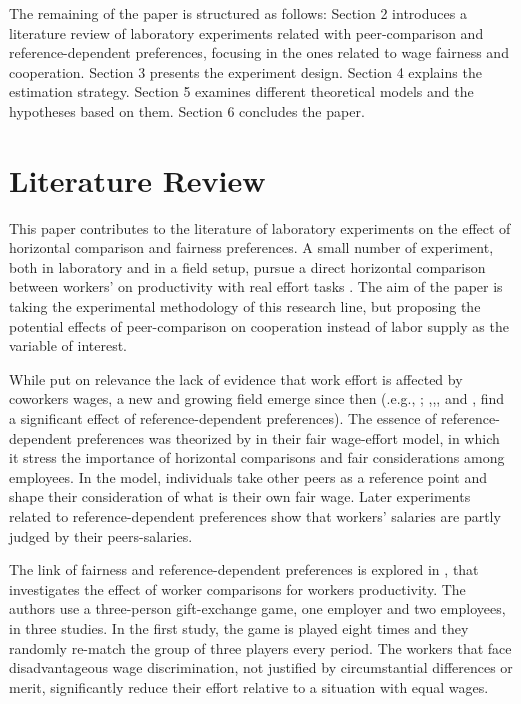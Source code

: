 \documentclass[a4paper, 12pt]{article}
\begin{document}
The remaining of the paper is structured as follows: Section 2 introduces a literature review of laboratory experiments related with peer-comparison and reference-dependent preferences, focusing in the ones related to wage fairness and cooperation. Section 3 presents the experiment design. Section 4 explains the estimation strategy. Section 5 examines different theoretical models and the hypotheses based on them. Section 6 concludes the paper. 

\section{Literature Review}

This paper contributes to the literature of laboratory experiments on the effect of horizontal comparison and fairness preferences. A small number of experiment, both in laboratory and in a field setup, pursue a direct horizontal comparison between workers’ on productivity with real effort tasks \citep{Greiner2011, Cohn2014, Azmat2015}. The aim of the paper is taking the experimental methodology of this research line, but proposing the potential effects of peer-comparison on cooperation instead of labor supply as the variable of interest. 

While \citep{Charness2007} put on relevance the lack of evidence that work effort is affected by coworkers wages, a new and growing field emerge since then (.e.g., \cite{Greiner2011}; \cite{Kube2012},\cite{Ku2013},\cite{Cohn2014}, and \cite{CohnFehr2014}, find a significant effect of reference-dependent preferences). The essence of reference-dependent preferences was theorized by \cite{Akerlof1990} in their fair wage-effort model, in which it stress the importance of horizontal comparisons and fair considerations among employees. In the model, individuals take other peers as a reference point and shape their consideration of what is their own fair wage. Later experiments related to reference-dependent preferences show that workers’ salaries are partly judged by their peers-salaries.

The link of fairness and reference-dependent preferences is explored in \cite{Gachter2012}, that investigates the effect of worker comparisons for workers productivity. The authors use a three-person gift-exchange game, one employer and two employees, in three studies. In the first study, the game is played eight times and they randomly re-match the group of three players every period. The workers that face disadvantageous wage discrimination, not justified by circumstantial differences or merit, significantly reduce their effort relative to a situation with equal wages. 
\end{document}

